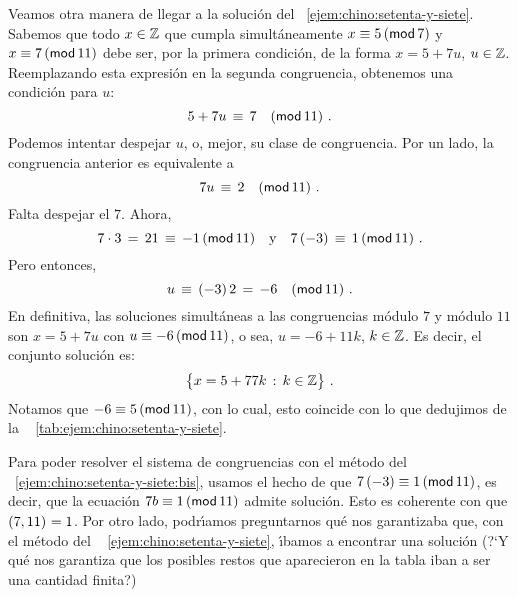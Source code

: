 \begin{ejemChino}\label{ejem:chino:setenta-y-siete:bis}
	Veamos otra manera de llegar a la soluci\'on del
	\ejemname~\ref{ejem:chino:setenta-y-siete}.
	Sabemos que todo $x\in\Enteros$ que cumpla simult\'aneamente
	$x\equiv 5\tmodulo[7]$ y $x\equiv 7\tmodulo[11]$ debe ser,
	por la primera condici\'on, de la forma
	$x=5+7u$, $u\in\Enteros$. Reemplazando esta expresi\'on en la
	segunda congruencia, obtenemos una condici\'on para $u$:
	\begin{displaymath}
		5+7u\,\equiv\,7\modulo[11]
		\dispstop
	\end{displaymath}
	Podemos intentar despejar $u$, o, mejor, su clase de congruencia.
	Por un lado, la congruencia anterior es equivalente a
	\begin{displaymath}
		7u\,\equiv\,2\modulo[11]
		\dispstop
	\end{displaymath}
	Falta despejar el $7$. Ahora,
	\begin{displaymath}
		7\cdot 3\,=\,21\,\equiv\,-1\tmodulo[11]\dispand
		7\,(-3)\,\equiv\,1\tmodulo[11]
		\dispstop
	\end{displaymath}
	Pero entonces,
	\begin{displaymath}
		u\,\equiv\,(-3)\,2\,=\,-6
		\modulo[11]
		\dispstop
	\end{displaymath}
	En definitiva, las soluciones simult\'aneas a las congruencias
	m\'odulo $7$ y m\'odulo $11$ son
	$x=5+7u$ con $u\equiv -6\tmodulo[11]$, o sea, $u=-6+11k$,
	$k\in\Enteros$. Es decir, el conjunto soluci\'on es:
	\begin{displaymath}
		\big\{x=5+77k\,:\,k\in\Enteros\big\}
		\dispstop
	\end{displaymath}
	Notamos que $-6\equiv 5\tmodulo[11]$, con lo cual, esto
	coincide con lo que dedujimos de la \tablename~%
	\ref{tab:ejem:chino:setenta-y-siete}.
\end{ejemChino}

\begin{obsChino}\label{obs:chino:setenta-y-siete}
	Para poder resolver el sistema de congruencias con el
	m\'etodo del \ejemname~\ref{ejem:chino:setenta-y-siete:bis},
	usamos el hecho de que $7\,(-3)\equiv 1\tmodulo[11]$,
	es decir, que la ecuaci\'on $7b\equiv 1\tmodulo[11]$ admite
	soluci\'on. Esto es coherente con que $\mcd{7,11}=1$.
	Por otro lado, podr\'{\i}amos preguntarnos qu\'e nos
	garantizaba que, con el m\'etodo del \ejemname~%
	\ref{ejem:chino:setenta-y-siete}, \'{\i}bamos a encontrar
	una soluci\'on
	(?`Y qu\'e nos garantiza que los posibles restos que
	aparecieron en la tabla iban a ser una cantidad finita?)
\end{obsChino}

